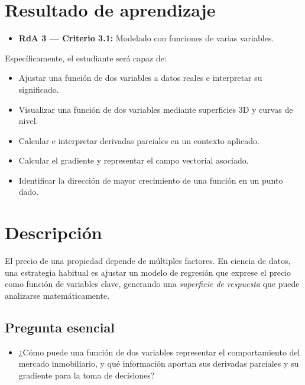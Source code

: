 \documentclass[a4,11pt]{aleph-notas}
\begin{document}
\encabezado

\section{Resultado de aprendizaje}

\begin{itemize}
    \item \textbf{RdA 3 — Criterio 3.1:} Modelado con funciones de varias variables.
\end{itemize}

Específicamente, el estudiante será capaz de:
\begin{itemize}
    \item Ajustar una función de dos variables a datos reales e interpretar su significado.
    \item Visualizar una función de dos variables mediante superficies 3D y curvas de nivel.
    \item Calcular e interpretar derivadas parciales en un contexto aplicado.
    \item Calcular el gradiente y representar el campo vectorial asociado.
    \item Identificar la dirección de mayor crecimiento de una función en un punto dado.
\end{itemize}


\section{Descripción}

El precio de una propiedad depende de múltiples factores. En ciencia de datos, una estrategia habitual es ajustar un modelo de regresión que exprese el precio como función de variables clave, generando una \emph{superficie de respuesta} que puede analizarse matemáticamente.

\subsection*{Pregunta esencial}
\begin{itemize}[leftmargin=*]
    \item ¿Cómo puede una función de dos variables representar el comportamiento del mercado inmobiliario, y qué información aportan sus derivadas parciales y su gradiente para la toma de decisiones?
\end{itemize}
\end{document}
